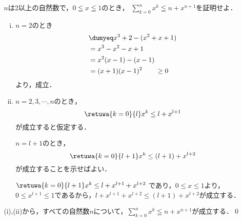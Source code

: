 \begin{problem}
$n$は2以上の自然数で，$0 \leqq x \leqq 1$のとき，
$\displaystyle\sum_{k=0}^nx^k \leqq n+x^{n+1}$を証明せよ．
\end{problem}

\begin{enumerate}[(i)]
  \item $n=2$のとき
  \begin{align*}
    &\dumyeq x^3 + 2 - (x^2+x+1)\\
    &= x^3 -x^2-x+1\\
    &= x^2(x-1)-(x-1)\\
    &= (x+1)(x-1)^2 \qquad\geq 0
  \end{align*}
  より，成立．
  \item $n=2,3,\cdots, n$のとき，
  \[\retuwa{k=0}{l}x^k \leq l + x^{l+1}\]
  が成立すると仮定する．

  $n = l+1$のとき，
  \[\retuwa{k=0}{l+1}x^k \leq (l+1)+x^{l+2}\]
  が成立することを示せばよい．

  $\retuwa{k=0}{l+1}x^k \leq l + x^{l+1}+x^{l+2}$ であり，$0 \leq x \leq 1$より，$0 \leq x^{l+1} \leq 1$であるから，$l + x^{l+1} + x^{l+2} \leq (l+1) + x^{l+2}$が成立する．
\end{enumerate}

(i),(ii)から，すべての自然数$n$について，$\displaystyle\sum_{k=0}^nx^k \leqq n+x^{n+1}$が成立する．\qed
